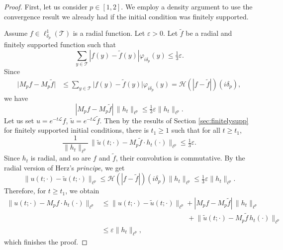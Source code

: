 \documentclass[11pt,a4paper,reqno]{amsart}
\renewcommand\mathcal{\mathscr}
\theoremstyle{plain}
\theoremstyle{remark}
\theoremstyle{definition}
\theoremstyle{remark}
\numberwithin{equation}{section}
\begin{document}
\begin{proof}
	First, let us consider $p \in [1, 2]$. We employ a density argument to use the convergence result we already had if the initial condition was finitely supported. 
	
	Assume $f \in \ell^1_{\delta_p}(\mathcal{T})$ is a radial function. Let $\varepsilon > 0$. Let $\tilde{f}$ be a radial and finitely supported 
	function such that
	\[
	\sum_{y \in \mathcal{T}} |f(y) - \tilde{f}(y)| \varphi_{i\delta_p}(y) \leq \tfrac{1}{3} \varepsilon.
	\]
	Since
	\begin{align*}
		\big| M_pf-M_p\tilde{f} \big| 
		&\leq 
		\sum_{y \in \mathcal{T}} \big|f(y) - \tilde{f}(y)\big| \varphi_{i\delta_p}(y) = \mathcal{H}(|f - \tilde{f}|)(i\delta_p) ,
	\end{align*}
	we have
	\[
	|M_pf-M_p\tilde{f}|\, \|h_t\|_{\ell^p} \leq \tfrac{1}{3} \varepsilon \|h_t\|_{\ell^p}.
	\]
	Let us set $u=e^{-t\mathcal{L}}{f}$, $\tilde{u}=e^{-t\mathcal{L}}\tilde{f}$.
	Then by the results of Section \ref{sec:finitelysupp} for finitely supported initial conditions, there is $t_1 \geqslant 1$ such that for all $t \geqslant t_1$,
	\[
	\frac{1}{\|h_t\|_{\ell^p}} \,\|\tilde{u}(t; \cdot)-M_p\tilde{f} \cdot h_t(\cdot) \|_{\ell^p}
	\leq \tfrac{1}{3} \varepsilon.
	\]
	Since $h_t$ is radial, and so are $f$ and $\tilde{f}$, their convolution is commutative. By the radial version of Herz's \emph{principe},  we get
	\[
	\big\|u(t;\cdot)-\tilde{u}(t;\cdot)\big\|_{\ell^p}
	\leq
	\mathcal{H} (|f - \tilde{f}|)(i\delta_p) \|h_t\|_{\ell^p} 
	\leq 
	\tfrac{1}{3} \varepsilon \|h_t\|_{\ell^p}.
	\]
	Therefore, for $t \geqslant t_1$, we obtain
	\begin{align*}
		\big\|u(t; \cdot) - M_pf \cdot h_t(\cdot)\big\|_{\ell^p}
		&\leq
		\big\|u(t;\cdot)-\tilde{u}(t;\cdot)\big\|_{\ell^p}
		+|M_pf-M_p\tilde{f}|\, \|h_t\|_{\ell^p} \\
		&\phantom{\leq \big\|u(t;\cdot)-\tilde{u}(t;\cdot)\big\|_{\ell^p} \ }
		+\big\|\tilde{u}(t;\cdot) - M_p\tilde{f}\, h_t(\cdot) \|_{\ell^p} \\
		&\leq \varepsilon \|h_t\|_{\ell^p},
	\end{align*}
	which finishes the proof.
	

\end{proof}
\end{document}
